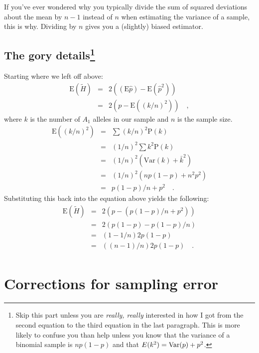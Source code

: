 \documentclass[12pt]{article}
\begin{document}
If you've ever wondered why you typically divide the sum of squared
deviations about the mean by $n-1$ instead of $n$ when estimating the
variance of a sample, this is why. Dividing by $n$ gives you a
(slightly) biased estimator.

\subsection*{The gory details\footnote{Skip this part unless
  you are {\it really, really\/} interested in how I got from the
second equation to the third equation in the last paragraph. This is
more likely to confuse you than help unless you know that the variance
of a binomial sample is $np(1-p)$ and that $E(k^2) = \hbox{Var}(p) +
p^2$.}}

Starting where we left off above:
\begin{eqnarray*}
\mbox{E}(\tilde H) &=& 2\left((\mbox{E}\hat p) - \mbox{E}({\hat p}^2)\right) \\
     &=& 2\left(p - \mbox{E}\left((k/n)^2\right)\right) \quad ,
\end{eqnarray*}
where $k$ is the number of $A_1$ alleles in our sample and $n$ is the
sample size.
\begin{eqnarray*}
\mbox{E}\left((k/n)^2\right) &=& \sum (k/n)^2 \mbox{P}(k) \\
                      &=& (1/n)^2 \sum k^2 \mbox{P}(k) \\
                      &=& (1/n)^2 \left(\mbox{Var}(k) + \bar k^2\right) \\
                      &=& (1/n)^2 \left(np(1-p) + n^2p^2\right) \\
                      &=& p(1-p)/n + p^2 \quad .
\end{eqnarray*}
Substituting this back into the equation above yields the following:
\begin{eqnarray*}
\mbox{E}(\tilde H) &=& 2\left(p - \left(p(1-p)/n + p^2\right)\right) \\
     &=& 2\left(p(1-p) - p(1-p)/n\right) \\
     &=& \left(1 - 1/n\right)2p(1-p) \\
     &=& ((n-1)/n)2p(1-p) \quad . \\
\end{eqnarray*}

\section*{Corrections for sampling error}
\end{document}
